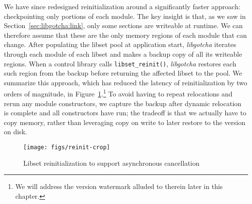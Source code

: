 \begin{promotesubsections}
\begin{swallowsections}
We have since redesigned reinitialization around a significantly faster approach:\@
checkpointing only portions of each module.  The key insight is that, as we saw in
Section~\ref{sec:libgotcha:link}, only some sections are writeable at runtime.  We
can therefore assume that these are the only memory regions of each module that can
change.  After populating the libset pool at application start, \textit{libgotcha}
iterates through each module of each libset and makes a backup copy of all its
writeable regions.  When a control library calls \texttt{libset\_reinit()},
\textit{libgotcha} restores each such region from the backup before returning the
affected libset to the pool.  We summarize this approach, which has reduced the
latency of reinitialization by two orders of magnitude, in
Figure~\ref{fig:reinit}.\footnote{We will address the version watermark alluded to
therein later in this chapter.}  To avoid having to repeat relocations and rerun any
module constructors, we capture the backup after dynamic relocation is complete and
all constructors have run; the tradeoff is that we actually have to copy memory,
rather than leveraging copy on write to later restore to the version on disk.

\begin{figure}
\texttt{[image: figs/reinit-crop]}
\caption{Libset reinitialization to support asynchronous cancellation}
\label{fig:reinit}
\end{figure}






\hspace{-1.5em}















\end{swallowsections}
\end{promotesubsections}
